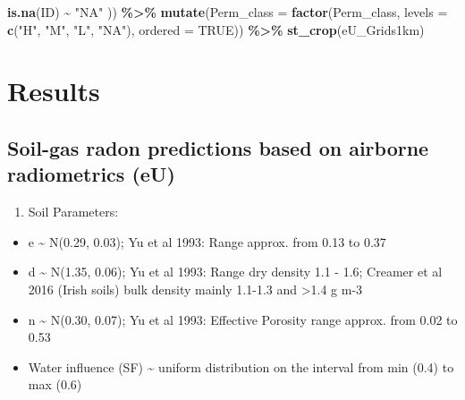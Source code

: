 \documentclass[
  12pt,
]{article}
\newenvironment{Shaded}{\begin{snugshade}}{\end{snugshade}}
\newcommand{\DataTypeTok}[1]{\textcolor[rgb]{0.13,0.29,0.53}{#1}}
\newcommand{\KeywordTok}[1]{\textcolor[rgb]{0.13,0.29,0.53}{\textbf{#1}}}
\newcommand{\NormalTok}[1]{#1}
\newcommand{\OperatorTok}[1]{\textcolor[rgb]{0.81,0.36,0.00}{\textbf{#1}}}
\newcommand{\OtherTok}[1]{\textcolor[rgb]{0.56,0.35,0.01}{#1}}
\newcommand{\StringTok}[1]{\textcolor[rgb]{0.31,0.60,0.02}{#1}}
\providecommand{\tightlist}{%
  \setlength{\itemsep}{0pt}\setlength{\parskip}{0pt}}
\begin{document}
\begin{Shaded}
\begin{Highlighting}[]
      \KeywordTok{is.na}\NormalTok{(ID) }\OperatorTok{\textasciitilde{}}\StringTok{ "NA"}\NormalTok{ )) }\OperatorTok{\%\textgreater{}\%}
\StringTok{    }\KeywordTok{mutate}\NormalTok{(}\DataTypeTok{Perm\_class =} \KeywordTok{factor}\NormalTok{(Perm\_class, }
                               \DataTypeTok{levels =} \KeywordTok{c}\NormalTok{(}\StringTok{"H"}\NormalTok{, }\StringTok{"M"}\NormalTok{, }\StringTok{"L"}\NormalTok{, }\StringTok{"NA"}\NormalTok{),}
                               \DataTypeTok{ordered =} \OtherTok{TRUE}\NormalTok{)) }\OperatorTok{\%\textgreater{}\%}
\StringTok{    }\KeywordTok{st\_crop}\NormalTok{(eU\_Grids1km)}
\end{Highlighting}
\end{Shaded}

\hypertarget{results}{%
\section{Results}\label{results}}

\hypertarget{soil-gas-radon-predictions-based-on-airborne-radiometrics-eu}{%
\subsection{Soil-gas radon predictions based on airborne radiometrics
(eU)}\label{soil-gas-radon-predictions-based-on-airborne-radiometrics-eu}}

\begin{enumerate}
\def\labelenumi{\alph{enumi})}
\tightlist
\item
  Soil Parameters:
\end{enumerate}

\begin{itemize}
\tightlist
\item
  e \textasciitilde{} N(0.29, 0.03); Yu et al 1993: Range approx. from
  0.13 to 0.37
\item
  d \textasciitilde{} N(1.35, 0.06); Yu et al 1993: Range dry density
  1.1 - 1.6; Creamer et al 2016 (Irish soils) bulk density mainly
  1.1-1.3 and \textgreater1.4 g m-3
\item
  n \textasciitilde{} N(0.30, 0.07); Yu et al 1993: Effective Porosity
  range approx. from 0.02 to 0.53
\item
  Water influence (SF) \textasciitilde{} uniform distribution on the
  interval from min (0.4) to max (0.6)
\end{itemize}
\end{document}
